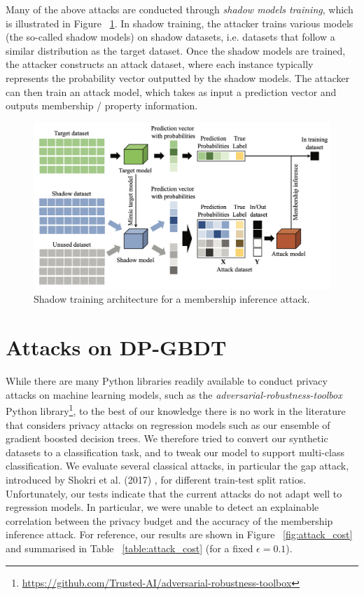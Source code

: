 Many of the above attacks are conducted through \textit{shadow models training}, which is illustrated in Figure ~\ref{fig:shadow}. In shadow training, the attacker trains various models (the so-called shadow models) on shadow datasets, i.e. datasets that follow a similar distribution as the target dataset. Once the shadow models are trained, the attacker constructs an attack dataset, where each instance typically represents the probability vector outputted by the shadow models. The attacker can then train an attack model, which takes as input a prediction vector and outputs membership / property information.

\begin{figure}[h!]
	\center
	\includegraphics[scale=0.52]{images/introduction/mia}
	\caption{\label{fig:shadow} Shadow training architecture for a membership inference attack. \cite{chen}}
\end{figure}

\section{Attacks on DP-GBDT}

While there are many Python libraries readily available to conduct privacy attacks on machine learning models, such as the \textit{adversarial-robustness-toolbox} Python library\footnote{\href{https://github.com/Trusted-AI/adversarial-robustness-toolbox}{https://github.com/Trusted-AI/adversarial-robustness-toolbox}}, to the best of our knowledge there is no work in the literature that considers privacy attacks on regression models such as our ensemble of gradient boosted decision trees. We therefore tried to convert our synthetic datasets to a classification task, and to tweak our model to support multi-class classification. We evaluate several classical attacks, in particular the gap attack, introduced by Shokri et al. (2017) \cite{shokri}, for different train-test split ratios. Unfortunately, our tests indicate that the current attacks do not adapt well to regression models. In particular, we were unable to detect an explainable correlation between the privacy budget and the accuracy of the membership inference attack. For reference, our results are shown in Figure ~\ref{fig:attack_cost} and summarised in Table ~\ref{table:attack_cost} (for a fixed $\epsilon=0.1$). 

